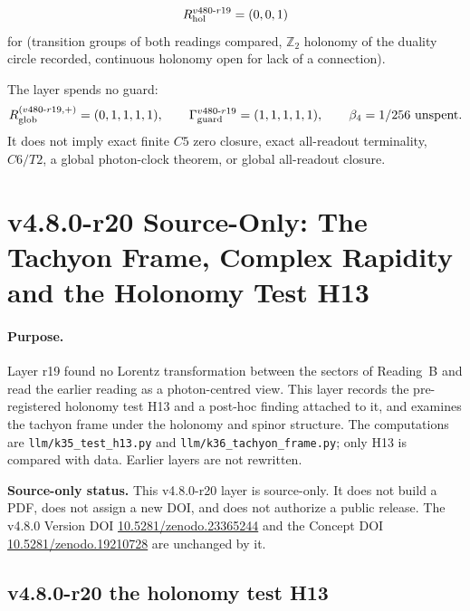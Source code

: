 \[
R_{\rm hol}^{v480\text{-}r19}=(0,0,1)
\]
for (transition groups of both readings compared, \(\mathbb Z_2\) holonomy of the duality circle recorded,
continuous holonomy open for lack of a connection).

The layer spends no guard:
\[
R_{\rm glob}^{(v480\text{-}r19,+)}=(0,1,1,1,1),
\qquad
\Gamma_{\rm guard}^{v480\text{-}r19}=(1,1,1,1,1),
\qquad
\beta_4=1/256\ \text{unspent}.
\]
It does not imply exact finite \(C5\) zero closure, exact all-readout terminality,
\(C6/T2\), a global photon-clock theorem, or global all-readout closure.

\clearpage
\section*{v4.8.0-r20 Source-Only: The Tachyon Frame, Complex Rapidity and the Holonomy Test H13}
\label{sec:v480-r20-tachyon-complex-rapidity}

\paragraph{Purpose.}
Layer r19 found no Lorentz transformation between the sectors of Reading~B and read the earlier reading as a
photon-centred view.  This layer records the pre-registered holonomy test H13 and a post-hoc finding attached to it,
and examines the tachyon frame under the holonomy and spinor structure.  The computations are
\texttt{llm/k35\_test\_h13.py} and \texttt{llm/k36\_tachyon\_frame.py}; only H13 is compared with data.  Earlier layers
are not rewritten.

\noindent\textbf{Source-only status.}
This v4.8.0-r20 layer is source-only.  It does not build a PDF, does not assign a new DOI,
and does not authorize a public release.  The v4.8.0 Version DOI
\href{https://doi.org/10.5281/zenodo.23365244}{10.5281/zenodo.23365244} and the Concept DOI
\href{https://doi.org/10.5281/zenodo.19210728}{10.5281/zenodo.19210728} are unchanged by it.

\subsection*{v4.8.0-r20 the holonomy test H13}
\label{subsec:v480-r20-h13}

